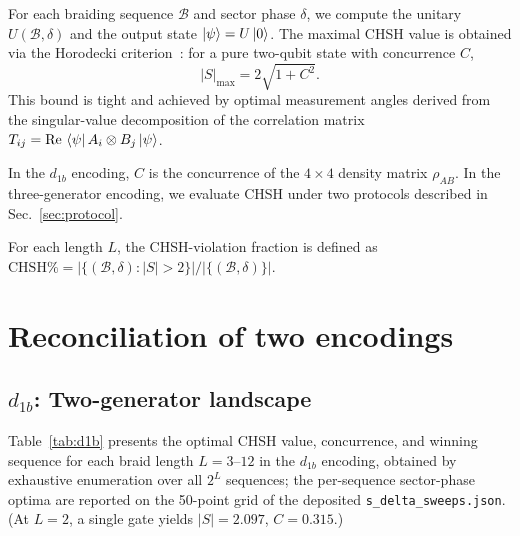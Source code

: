 \documentclass[aps,pra,twocolumn,superscriptaddress,longbibliography,floatfix,nofootinbib]{revtex4-2}
\begin{document}
For each braiding sequence $\mathcal{B}$ and sector phase $\delta$,
we compute the unitary $U(\mathcal{B},\delta)$ and the output
state $\ket{\psi} = U\ket{0}$.
The maximal CHSH value is obtained via the
Horodecki criterion~\cite{Horodecki1995}: for a pure two-qubit
state with concurrence $C$,
\begin{equation}
\label{eq:horodecki}
|S|_{\max} = 2\sqrt{1+C^2}.
\end{equation}
This bound is tight and achieved by optimal measurement
angles derived from the singular-value decomposition of the
correlation matrix $T_{ij} = \text{Re}\,\bra{\psi}A_i\otimes B_j\ket{\psi}$.

In the $d_{1b}$ encoding, $C$ is the concurrence of the
$4\times 4$ density matrix $\rho_{AB}$.
In the three-generator encoding, we evaluate CHSH under two
protocols described in Sec.~\ref{sec:protocol}.

For each length $L$, the CHSH-violation fraction is defined as
$\text{CHSH\%} = |\{(\mathcal{B},\delta) : |S|>2\}| / |\{(\mathcal{B},\delta)\}|$.

\section{Reconciliation of two encodings}
\label{sec:reconciliation}

\subsection{$d_{1b}$: Two-generator landscape}

Table~\ref{tab:d1b} presents the optimal CHSH value, concurrence,
and winning sequence for each braid length $L=3$--$12$ in the
$d_{1b}$ encoding, obtained by exhaustive enumeration over all
$2^L$ sequences; the per-sequence sector-phase optima are reported
on the 50-point grid of the deposited \texttt{s\_delta\_sweeps.json}.
(At $L=2$, a single gate yields $|S|=2.097$, $C=0.315$.)
\end{document}
